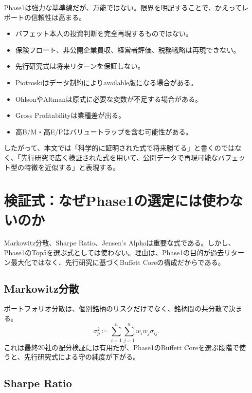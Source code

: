 \documentclass[11pt,a4paper]{article}
\begin{document}
Phase1は強力な基準線だが、万能ではない。限界を明記することで、かえってレポートの信頼性は高まる。

\begin{warnbox}
\begin{itemize}[leftmargin=1.5em]
\item バフェット本人の投資判断を完全再現するものではない。
\item 保険フロート、非公開企業買収、経営者評価、税務戦略は再現できない。
\item 先行研究式は将来リターンを保証しない。
\item Piotroskiはデータ制約によりavailable版になる場合がある。
\item OhlsonやAltmanは原式に必要な変数が不足する場合がある。
\item Gross Profitabilityは業種差が出る。
\item 高B/M・高E/Pはバリュートラップを含む可能性がある。
\end{itemize}
\end{warnbox}

したがって、本文では「科学的に証明された式で将来勝てる」と書くのではなく、「先行研究で広く検証された式を用いて、公開データで再現可能なバフェット型の特徴を近似する」と表現する。


\clearpage
\section{検証式：なぜPhase1の選定には使わないのか}

Markowitz分散、Sharpe Ratio、Jensen's Alphaは重要な式である。しかし、Phase1のTop5を選ぶ式としては使わない。理由は、Phase1の目的が過去リターン最大化ではなく、先行研究に基づくBuffett Coreの構成だからである。

\subsection{Markowitz分散}

ポートフォリオ分散は、個別銘柄のリスクだけでなく、銘柄間の共分散で決まる。
\begin{equation}
\sigma_p^2 \coloneqq \sum_{i=1}^{n}\sum_{j=1}^{n} w_iw_j\sigma_{ij}.
\label{eq:markowitz}
\end{equation}
これは最終20社の配分検証には有用だが、Phase1のBuffett Coreを選ぶ段階で使うと、先行研究式による守の純度が下がる。

\subsection{Sharpe Ratio}
\end{document}
